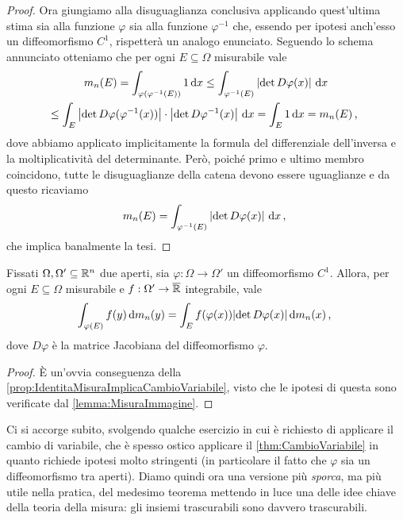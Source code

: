 \begin{proof}
	Ora giungiamo alla disuguaglianza conclusiva applicando quest'ultima stima sia alla funzione $\varphi$ sia alla funzione $\varphi^{-1}$ che, essendo per ipotesi anch'esso un diffeomorfismo $C^1$, rispetterà un analogo enunciato.
	Seguendo lo schema annunciato otteniamo che per ogni $E\subseteq\Omega$ misurabile vale
	\begin{multline*}
		m_n(E) =\int_{\varphi(\varphi^{-1}(E))}1\,\mathrm d x\le \int_{\varphi^{-1}(E)} \left\lvert\det D\varphi(x)\right\rvert\,\mathrm d x \\
 		\le \int_E \left\lvert\det D\varphi(\varphi^{-1}(x))\right\rvert \cdot \left\lvert\det D\varphi^{-1}(x)\right\rvert\,\mathrm d x =\int_E 1\,\mathrm d x=m_n(E) \, \text{, }
	\end{multline*}
	dove abbiamo applicato implicitamente la formula del differenziale dell'inversa e la moltiplicatività del determinante.
	Però, poiché primo e ultimo membro coincidono, tutte le disuguaglianze della catena devono essere uguaglianze e da questo ricaviamo
	\begin{equation*}
		m_n(E)=\int_{\varphi^{-1}(E)} \left\lvert\det D\varphi(x)\right\rvert\,\mathrm d x \, \text{, }
	\end{equation*}
	che implica banalmente la tesi.
\end{proof}

\begin{theorem}\label{thm:CambioVariabile}
	Fissati $\Omega,\Omega'\subseteq\mathbb R^n$ due aperti, sia $\varphi:\Omega\to\Omega'$ un diffeomorfismo $C^1$.
	Allora, per ogni $E\subseteq \Omega$ misurabile e $f:\Omega'\to\overline{\mathbb R}$ integrabile, vale
	\begin{equation*}
		\int_{\varphi(E)} f(y)\,\mathrm d m_n(y) = \int_{E} f(\varphi(x))\lvert \det D\varphi(x) \rvert \,\mathrm d m_n(x) \, \text{, }
	\end{equation*}
	dove $D\varphi$ è la matrice Jacobiana del diffeomorfismo $\varphi$.
\end{theorem}
\begin{proof}
	È un'ovvia conseguenza della \cref{prop:IdentitaMisuraImplicaCambioVariabile}, visto che le ipotesi di questa sono verificate dal \cref{lemma:MisuraImmagine}.
\end{proof}

Ci si accorge subito, svolgendo qualche esercizio in cui è richiesto di applicare il cambio di variabile, che è spesso ostico applicare il \cref{thm:CambioVariabile} in quanto richiede ipotesi molto stringenti (in particolare il fatto che $\varphi$ sia un diffeomorfismo tra aperti). 
Diamo quindi ora una versione più \emph{sporca}, ma più utile nella pratica, del medesimo teorema mettendo in luce una delle idee chiave della teoria della misura: gli insiemi trascurabili sono davvero trascurabili.


